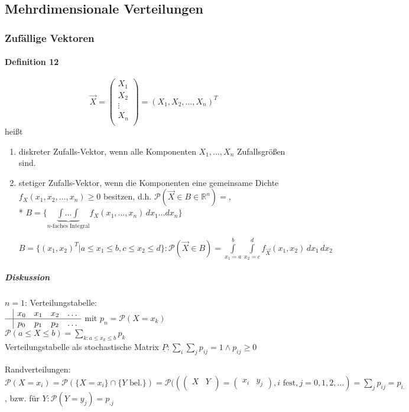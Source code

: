 \documentclass[a4paper]{scrartcl}
\begin{document}
\subsection{Mehrdimensionale Verteilungen}
\subsubsection{Zufällige Vektoren}
\paragraph{Definition 12} \[ \vec{X} = \begin{pmatrix} X_1 \\ X_2 \\ \vdots \\ X_n \\ \end{pmatrix} = (X_1,X_2,\dots,X_n)^T\] heißt
\begin{enumerate}
\item diskreter Zufalls-Vektor, wenn alle Komponenten $X_1,\dots,X_n$ Zufallsgrößen sind.
\item stetiger Zufalls-Vektor, wenn die Komponenten eine gemeinsame Dichte $f_X (x_1,x_2,\dots,x_n) \geq 0$ besitzen, d.h. $\mathcal{P} (\vec{X} \in B \in \mathbb{R}^n) = $,\\*
$B=\{ \underbrace{\int \dots \int}_{n\text{-faches Integral}} f_X (x_1,\dots,x_n) \, dx_1 \dots dx_n \}$

$B= \{ (x_1,x_2)^T | a \leq x_1 \leq b, c \leq x_2 \leq d \}: \mathcal{P}(\vec{X} \in B) = \int\limits_{x_1 = a}^{b} \int\limits_{x_2 = c}^{d} f_{\vec{X}} (x_1,x_2) \, dx_1 \, dx_2$
\end{enumerate}

\subparagraph{Diskussion} $n=1$: Verteilungstabelle:\\
$\begin{array}{c|cccc}
& x_0 & x_1 & x_2 & \dots \\ \hline
& p_0 & p_1 & p_2 & \dots \\
\end{array}$ mit $p_n = \mathcal{P} (X = x_k)$\\
$\mathcal{P} (a \leq X \leq b) = \sum\limits_{k:a \leq x_k \leq b} p_k$\\

Verteilungstabelle als stochastische Matrix $\underline{P}:\sum\limits_i \sum\limits_j p_{ij} = 1 \wedge p_{ij} \geq 0$

 Randverteilungen: $\mathcal{P} (X=x_i) = \mathcal{P} ( \{ X = x_i \} \cap \{Y \text{ bel.}\} ) = \mathcal{P} ( (\begin{pmatrix} X & Y \\ \end{pmatrix} = \begin{pmatrix} x_i & y_j \end{pmatrix}, i \text{ fest}, j=0,1,2,\dots) = \sum\limits_j p_{ij} = p_{i.}$, bzw. für $Y : \mathcal{P} ( Y = y_j ) = p_{.j}$
\end{document}
